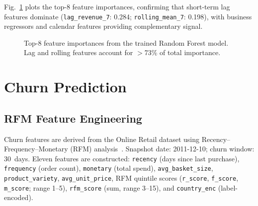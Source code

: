 \documentclass[conference]{IEEEtran}
\begin{document}
Fig.~\ref{fig:importance} plots the top-8 feature importances, confirming that
short-term lag features dominate (\texttt{lag\_revenue\_7}: 0.284;
\texttt{rolling\_mean\_7}: 0.198), with business regressors and calendar features
providing complementary signal.

\begin{figure}[H]
\centering
{}
\caption{Top-8 feature importances from the trained Random Forest model.
  Lag and rolling features account for $>$73\% of total importance.}
\label{fig:importance}
\end{figure}

\section{Churn Prediction}

\subsection{RFM Feature Engineering}

Churn features are derived from the Online Retail dataset using Recency–Frequency–Monetary
(RFM) analysis~\cite{rfm1994}.  Snapshot date: 2011-12-10; churn window: 30~days.
Eleven features are constructed: \texttt{recency} (days since last purchase),
\texttt{frequency} (order count), \texttt{monetary} (total spend),
\texttt{avg\_basket\_size}, \texttt{product\_variety}, \texttt{avg\_unit\_price},
RFM quintile scores (\texttt{r\_score}, \texttt{f\_score}, \texttt{m\_score}; range
1–5), \texttt{rfm\_score} (sum, range 3–15), and \texttt{country\_enc} (label-encoded).
\end{document}
